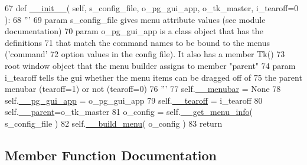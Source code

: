 \begin{DoxyCode}
67     \textcolor{keyword}{def }\hyperlink{classnegui_1_1pgmenubuilder_1_1PGMenuBuilder_a8e612e54bfe556d763a7150d8d8cbec5}{\_\_init\_\_}( self, s\_config\_file, o\_pg\_gui\_app,  o\_tk\_master, i\_tearoff=0 ):
68         \textcolor{stringliteral}{'''}
69 \textcolor{stringliteral}{        param s\_config\_file gives menu attribute values (see module documentation)}
70 \textcolor{stringliteral}{        param o\_pg\_gui\_app is a class object that has the definitions}
71 \textcolor{stringliteral}{                that match the command names to be bound to the menus ('command' }
72 \textcolor{stringliteral}{                option values in the config file). It also has a member Tk()}
73 \textcolor{stringliteral}{                root window object that the menu builder assigns to member "parent"}
74 \textcolor{stringliteral}{        param i\_tearoff tells the gui whether the menu items can be dragged off of }
75 \textcolor{stringliteral}{            the parent menubar (tearoff=1) or not (tearoff=0)}
76 \textcolor{stringliteral}{        '''}
77         self.\hyperlink{classnegui_1_1pgmenubuilder_1_1PGMenuBuilder_ae68d0c5a32a42f23fae44d177125e639}{\_\_menubar} = \textcolor{keywordtype}{None}
78         self.\hyperlink{classnegui_1_1pgmenubuilder_1_1PGMenuBuilder_af0a1a02f4ae4cb51ddcae82ff1bda3b8}{\_\_pg\_gui\_app} = o\_pg\_gui\_app
79         self.\hyperlink{classnegui_1_1pgmenubuilder_1_1PGMenuBuilder_aa1c29f9898f4129fa7a8c3fa52498322}{\_\_tearoff} = i\_tearoff
80         self.\hyperlink{classnegui_1_1pgmenubuilder_1_1PGMenuBuilder_a96fdfb4d4b5bfc2cb502ca5c513f4326}{\_\_parent}=o\_tk\_master
81         o\_config = self.\hyperlink{classnegui_1_1pgmenubuilder_1_1PGMenuBuilder_af9e8faf1c4c173851774fb37f0900a2c}{\_\_get\_menu\_info}( s\_config\_file )
82         self.\hyperlink{classnegui_1_1pgmenubuilder_1_1PGMenuBuilder_a308e619e77dc646c8668bbced4171394}{\_\_build\_menu}( o\_config )
83         \textcolor{keywordflow}{return}
\end{DoxyCode}


\subsection{Member Function Documentation}
